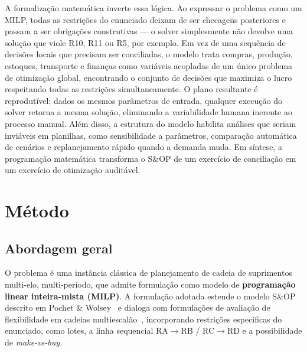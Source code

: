 \documentclass[11pt,a4paper]{article}
\begin{document}
A formalização matemática inverte essa lógica. Ao expressar o problema como um MILP, todas as restrições do enunciado deixam de ser checagens posteriores e passam a ser obrigações construtivas — o solver simplesmente não devolve uma solução que viole R10, R11 ou R5, por exemplo. Em vez de uma sequência de decisões locais que precisam ser conciliadas, o modelo trata compras, produção, estoques, transporte e finanças como variáveis acopladas de um único problema de otimização global, encontrando o conjunto de decisões que maximiza o lucro respeitando todas as restrições simultaneamente. O plano resultante é reprodutível: dados os mesmos parâmetros de entrada, qualquer execução do solver retorna a mesma solução, eliminando a variabilidade humana inerente ao processo manual. Além disso, a estrutura do modelo habilita análises que seriam inviáveis em planilhas, como sensibilidade a parâmetros, comparação automática de cenários e replanejamento rápido quando a demanda muda. Em síntese, a programação matemática transforma o S\&OP de um exercício de conciliação em um exercício de otimização auditável.

\section{Método}
\label{sec:metodo}

\subsection{Abordagem geral}
O problema é uma instância clássica de planejamento de cadeia de suprimentos multi-elo, multi-período, que admite formulação como modelo de \textbf{programação linear inteira-mista (MILP)}. A formulação adotada estende o modelo S\&OP descrito em Pochet \& Wolsey~\cite{pochet2006production} e dialoga com formulações de avaliação de flexibilidade em cadeias multiescalão~\cite{almeida2018flexibility}, incorporando restrições específicas do enunciado, como lotes, a linha sequencial RA$\to$RB / RC$\to$RD e a possibilidade de \emph{make-vs-buy}.
\end{document}
